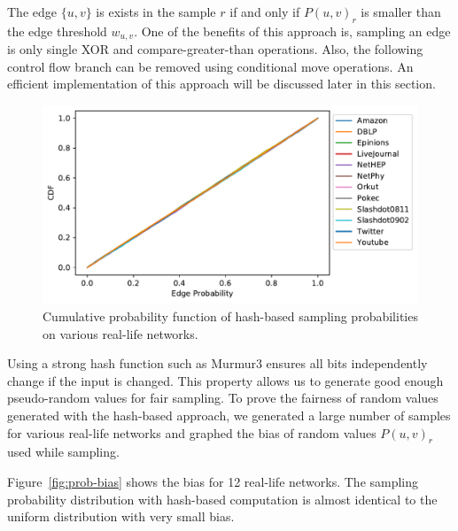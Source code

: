 \documentclass[10pt,journal,compsoc]{IEEEtran}
\begin{document}
The edge $\{u,v\}$ is exists in the sample $r$ if and only if  ${P}(u,v)_r$ is smaller than the edge threshold $w_{u,v}$. One of the benefits of this approach is, sampling an edge is only single XOR and compare-greater-than operations. Also, the following control flow branch can be removed using conditional move operations. 
An efficient implementation of this approach will be discussed later in this section.
\begin{figure}[!ht] 
    \centering
    \includegraphics[width=1\linewidth]{./images/cdf.pdf}
    \caption{Cumulative probability function of hash-based sampling probabilities on various real-life networks.}
    \label{fig:prob-cdf} 
\end{figure}
Using a strong hash function such as {{\sc Murmur3}} ensures all bits independently change if the input is changed. This property allows us to generate good enough pseudo-random values for fair sampling. To prove the fairness of random values generated with the hash-based approach, we generated a large number of samples for various real-life networks and graphed the bias of random values $P(u,v)_r$ used while sampling.

Figure~\ref{fig:prob-bias} shows the bias for 12 real-life networks. The sampling probability distribution with hash-based computation is almost identical to the uniform distribution with very small bias.
\end{document}
